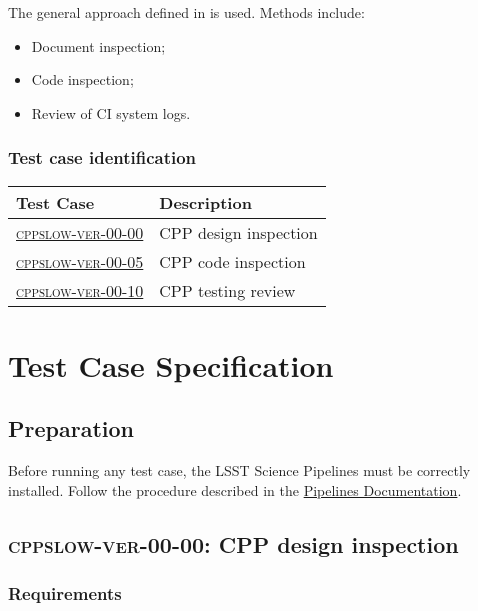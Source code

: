 \documentclass[DM,lsstdraft,STS,toc]{lsstdoc}
\begin{document}
The general approach defined in  is used. Methods include:

\begin{itemize}

  \item{Document inspection;}
  \item{Code inspection;}
  \item{Review of CI system logs.}

\end{itemize}

\subsubsection{Test case identification}

\begin{longtable} {|p{}|p{}|}\hline
\textbf{Test Case}  & \textbf{Description} \\\hline
\hyperref[cppslow-ver-00-00]{\textsc{cppslow-ver-00-00}} & CPP design inspection \\\hline
\hyperref[cppslow-ver-00-05]{\textsc{cppslow-ver-00-05}} & CPP code inspection \\\hline
\hyperref[cppslow-ver-00-10]{\textsc{cppslow-ver-00-10}} & CPP testing review \\\hline
\end{longtable}

\section{Test Case Specification}

\subsection{Preparation}

Before running any test case, the LSST Science Pipelines must be correctly
installed. Follow the procedure described in the
\href{https://pipelines.lsst.io}{Pipelines Documentation}.

\subsection{\textsc{cppslow-ver-00-00}: CPP design inspection}
\label{cppslow-ver-00-00}

\subsubsection{Requirements}
\end{document}
